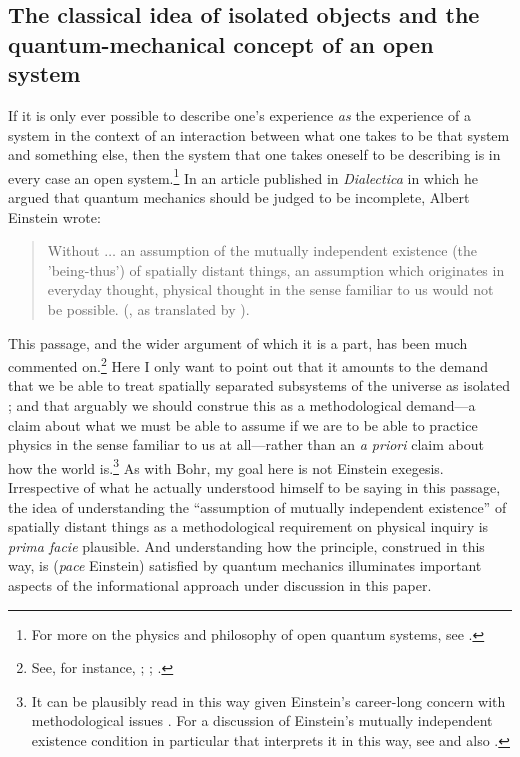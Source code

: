 \documentclass[12pt,english,twoside]{article}
\numberwithin{equation}{section}
\begin{document}

\subsection{\sloppy The classical idea of isolated objects and the quantum-mechanical concept of an open system}
\label{sec:isolated_objects}

If it is only ever possible to describe one's experience \emph{as} the experience of a system in the context of an interaction between what one takes to be that system and something else, then the system that one takes oneself to be describing is in every case an open system.\footnote{For more on the physics and philosophy of open quantum systems, see \citet[]{cuffaroHartmannOpenSystemsView}.} In an article published in \emph{Dialectica} in which he argued that quantum mechanics should be judged to be incomplete, Albert Einstein wrote:

\begin{quote}
Without $\dots$ an assumption of the mutually independent existence (the 'being-thus') of spatially distant things, an assumption which originates in everyday thought, physical thought in the sense familiar to us would not be possible. (\citealt[]{einstein1948}, as translated by \citealt[p. 187]{howard1985}).
\end{quote}

This passage, and the wider argument of which it is a part, has been much commented on.\footnote{See, for instance, \citet[ch. 4]{demopoulosOnTheories}; \citet{howard1985}; \citet[]{ramirez2020}.} Here I only want to point out that it amounts to the demand that we be able to treat spatially separated subsystems of the universe as isolated \citep[cf.][]{wallaceIsolatedSystemsI}; and that arguably we should construe this as a methodological demand---a claim about what we must be able to assume if we are to be able to practice physics in the sense familiar to us at all---rather than an \emph{a priori} claim about how the world is.\footnote{It can be plausibly read in this way given Einstein's career-long concern with methodological issues \citep[see][]{lehner2014}. For a discussion of Einstein's mutually independent existence condition in particular that interprets it in this way, see \citet[ch. 4]{demopoulosOnTheories} and also \citet[]{cuffaroInfCausality}.} As with Bohr, my goal here is not Einstein exegesis. Irrespective of what he actually understood himself to be saying in this passage, the idea of understanding the ``assumption of mutually independent existence'' of spatially distant things as a methodological requirement on physical inquiry is \emph{prima facie} plausible. And understanding how the principle, construed in this way, is (\emph{pace} Einstein) satisfied by quantum mechanics illuminates important aspects of the informational approach under discussion in this paper.
\end{document}
